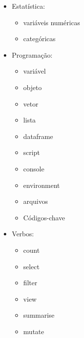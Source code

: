 \documentclass[
]{book}
\providecommand{\tightlist}{%
  \setlength{\itemsep}{0pt}\setlength{\parskip}{0pt}}
\begin{document}
\begin{itemize}
\tightlist
\item
  Estatística:

  \begin{itemize}
  \tightlist
  \item
    variáveis numéricas
  \item
    categóricas
  \end{itemize}
\item
  Programação:

  \begin{itemize}
  \tightlist
  \item
    variável
  \item
    objeto
  \item
    vetor
  \item
    lista
  \item
    dataframe
  \item
    script
  \item
    console
  \item
    environment
  \item
    arquivos
  \item
    Códigos-chave
  \end{itemize}
\item
  Verbos:

  \begin{itemize}
  \tightlist
  \item
    count
  \item
    select
  \item
    filter
  \item
    view
  \item
    summarise
  \item
    mutate
  \end{itemize}
\end{itemize}

  
\end{document}
